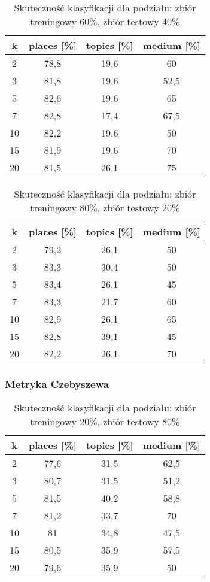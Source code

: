 \documentclass{classrep}
\begin{document}
\begin{table}[H]
	\centering
	\begin{tabular}{c c c c} 
		\hline
		\textbf{k} & \textbf{places [\%]} & \textbf{topics [\%]} &  \textbf{medium [\%]} \\ [0.5ex] 
		\hline
		\hline 
2 & 78,8 & 19,6 & 60 \\ 
3 & 81,8 & 19,6 & 52,5 \\ 
5 & 82,6 & 19,6 & 65 \\ 
7 & 82,8 & 17,4 & 67,5 \\ 
10 & 82,2 & 19,6 & 50 \\ 
15 & 81,9 & 19,6 & 70 \\ 
20 & 81,5 & 26,1 & 75 \\ 
		\hline
	\end{tabular}
	\caption{Skuteczność klasyfikacji dla podziału: zbiór treningowy 60\%, zbiór testowy 40\%}
\end{table}

\begin{table}[H]
	\centering
	\begin{tabular}{c c c c} 
		\hline
		\textbf{k} & \textbf{places [\%]} & \textbf{topics [\%]} &  \textbf{medium [\%]} \\ [0.5ex] 
		\hline
		\hline 
2 & 79,2 & 26,1 & 50 \\ 
3 & 83,3 & 30,4 & 50 \\ 
5 & 83,4 & 26,1 & 45 \\ 
7 & 83,3 & 21,7 & 60 \\ 
10 & 82,9 & 26,1 & 65 \\ 
15 & 82,8 & 39,1 & 45 \\ 
20 & 82,2 & 26,1 & 70 \\ 

		\hline
	\end{tabular}
	\caption{Skuteczność klasyfikacji dla podziału: zbiór treningowy 80\%, zbiór testowy 20\%}
\end{table}

\subsubsection{Metryka Czebyszewa}
\begin{table}[H]
	\centering
	\begin{tabular}{c c c c} 
		\hline
		\textbf{k} & \textbf{places [\%]} & \textbf{topics [\%]} &  \textbf{medium [\%]} \\ [0.5ex] 
		\hline
		\hline 
2 & 77,6 & 31,5 & 62,5 \\ 
3 & 80,7 & 31,5 & 51,2 \\ 
5 & 81,5 & 40,2 & 58,8 \\ 
7 & 81,2 & 33,7 & 70 \\ 
10 & 81 & 34,8 & 47,5 \\ 
15 & 80,5 & 35,9 & 57,5 \\ 
20 & 79,6 & 35,9 & 50 \\ 
		\hline
	\end{tabular}
	\caption{Skuteczność klasyfikacji dla podziału: zbiór treningowy 20\%, zbiór testowy 80\%}
\end{table}
\end{document}
